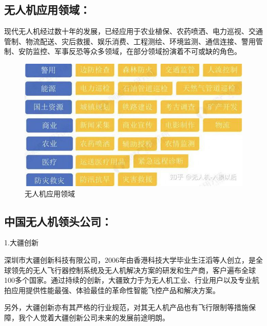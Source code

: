 \documentclass{article}
\begin{document}
\subsection{无人机应用领域：\citep{8}\citep{7}}

现代无人机经过数十年的发展，已经应用于农业植保、农药喷洒、电力巡视、交通管制、物流配送、灾后救援、娱乐消费、工程测绘、环境监测、通信连接、警用管制、安防监控、军事反恐等众多领域，在部分领域扮演着不可或缺的角色。\par

\par
\begin{figure}[h!]
\centering
\includegraphics[scale=0.5]{1}
\caption{无人机应用领域}
\label{fig:1}
\end{figure}







\subsection{中国无人机领头公司：}
1.大疆创新\par
深圳市大疆创新科技有限公司，2006年由香港科技大学毕业生汪滔等人创立，是全球领先的无人飞行器控制系统及无人机解决方案的研发和生产商，客户遍布全球100多个国家。通过持续的创新，大疆致力于为无人机工业、行业用户以及专业航拍应用提供性能最强、体验最佳的革命性智能飞控产品和解决方案。\par
另外，大疆创新亦有其严格的行业规范，对其无人机产品也有飞行限制等措施保障，我个人觉着大疆创新公司未来的发展前途明朗。\par
\end{document}
